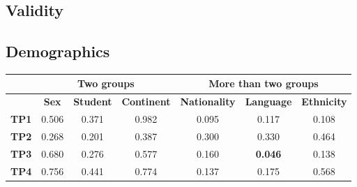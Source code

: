 \subsection{Validity}
\label{sec:results-validity}

\subsection{Demographics}
\label{sec:results-demographics}
\begin{table}
    \small
    \centering
    \begin{tabular}{lccc|ccc}
        \toprule
                      & \multicolumn{3}{c}{\textbf{Two groups}} & \multicolumn{3}{c}{\textbf{More than two groups}}                                                                                                                                                                       \\
        \midrule
                      & \multicolumn{1}{c}{\textbf{Sex}}        & \multicolumn{1}{c}{\textbf{Student}}              & \multicolumn{1}{c}{\textbf{Continent}} & \multicolumn{1}{c}{\textbf{Nationality}} & \multicolumn{1}{c}{\textbf{Language}}  & \multicolumn{1}{c}{\textbf{Ethnicity}} \\
        \midrule
        \textbf{TP1}  & 0.506                                   & 0.371                                             & 0.982                                  & 0.095                                    & 0.117                                  & 0.108                                  \\
        \textbf{TP2}  & 0.268                                   & 0.201                                             & 0.387                                  & 0.300                                    & 0.330                                  & 0.464                                  \\
        \textbf{TP3}  & 0.680                                   & 0.276                                             & 0.577                                  & 0.160                                    & \cellcolor[HTML]{EFEFEF}\textbf{0.046} & 0.138                                  \\
        \textbf{TP4}  & 0.756                                   & 0.441                                             & 0.774                                  & 0.137                                    & 0.175                                  & 0.568                                  \\

\end{tabular}
\end{table}
